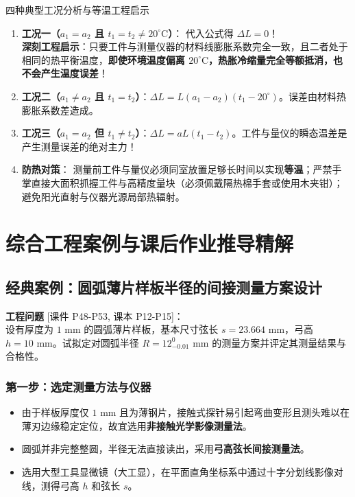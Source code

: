 \documentclass[11pt,a4paper]{ctexart}
\begin{document}
\begin{pointbox}{四种典型工况分析与等温工程启示}
\begin{enumerate}[leftmargin=1.5em, itemsep=3pt]
    \item \textbf{工况一（$a_1 = a_2$ 且 $t_1 = t_2 \ne 20^\circ\mathrm{C}$）}：
    代入公式得 $\Delta L = 0$！\\
    \textbf{深刻工程启示}：只要工件与测量仪器的材料线膨胀系数完全一致，且二者处于相同的热平衡温度，\textbf{即使环境温度偏离 $20^\circ\mathrm{C}$，热胀冷缩量完全等额抵消，也不会产生温度误差}！
    \item \textbf{工况二（$a_1 \ne a_2$ 且 $t_1 = t_2$）}：$\Delta L = L (a_1 - a_2)(t_1 - 20^\circ)$。误差由材料热膨胀系数差造成。
    \item \textbf{工况三（$a_1 = a_2$ 但 $t_1 \ne t_2$）}：$\Delta L = a L (t_1 - t_2)$。工件与量仪的瞬态温差是产生测量误差的绝对主力！
    \item \textbf{防热对策}：
    测量前工件与量仪必须同室放置足够长时间以实现\textbf{等温}；严禁手掌直接大面积抓握工件与高精度量块（必须佩戴隔热棉手套或使用木夹钳）；避免阳光直射与仪器光源局部热辐射。
\end{enumerate}
\end{pointbox}

\newpage
\section{综合工程案例与课后作业推导精解}

\subsection{经典案例：圆弧薄片样板半径的间接测量方案设计}
\noindent\textbf{工程问题} \hfill\textsf{[课件 P48-P53, 课本 P12-P15]}：\\
设有厚度为 $1\text{ mm}$ 的圆弧薄片样板，基本尺寸弦长 $s = 23.664\text{ mm}$，弓高 $h = 10\text{ mm}$。试拟定对圆弧半径 $R = 12_{-0.01}^{0}\text{ mm}$ 的测量方案并评定其测量结果与合格性。

\subsubsection{第一步：选定测量方法与仪器}
\begin{itemize}[leftmargin=1.5em, itemsep=2pt]
    \item 由于样板厚度仅 $1\text{ mm}$ 且为薄钢片，接触式探针易引起弯曲变形且测头难以在薄刃边缘稳定定位，故宜选用\textbf{非接触光学影像测量法}。
    \item 圆弧并非完整整圆，半径无法直接读出，采用\textbf{弓高弦长间接测量法}。
    \item 选用大型工具显微镜（大工显），在平面直角坐标系中通过十字分划线影像对线，测得弓高 $h$ 和弦长 $s$。
\end{itemize}
\end{document}
